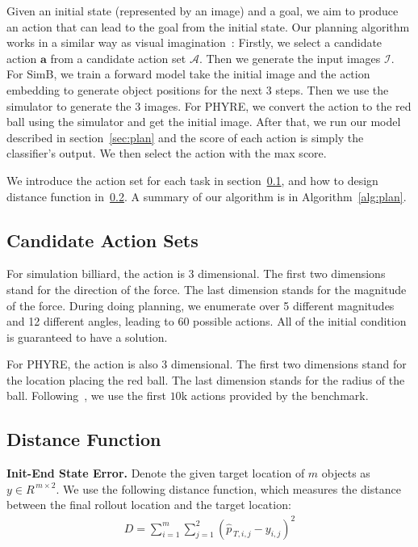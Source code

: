 \documentclass{article} \usepackage{iclr2021_conference,times}
\newcommand{\numoutput}{T}
\newcommand{\numobj}{m}
\begin{document}
Given an initial state (represented by an image) and a goal, we aim to produce an action that can lead to the goal from the initial state. Our planning algorithm works in a similar way as visual imagination~\cite{fragkiadaki2015learning}: Firstly, we select a candidate action $\mathbf{a}$ from a candidate action set $\mathcal{A}$. Then we generate the input images $\mathcal{I}$. For SimB, we train a forward model take the initial image and the action embedding to generate object positions for the next 3 steps. Then we use the simulator to generate the 3 images. For PHYRE, we convert the action to the red ball using the simulator and get the initial image. After that, we run our model described in section~\ref{sec:plan} and the score of each action is simply the classifier's output. We then select the action with the max score. 

We introduce the action set for each task in section~\ref{sec:actset}, and how to design distance function in~\ref{sec:dist}. A summary of our algorithm is in Algorithm~\ref{alg:plan}.

\subsection{Candidate Action Sets}
\label{sec:actset}

For simulation billiard, the action is 3 dimensional. The first two dimensions stand for the direction of the force. The last dimension stands for the magnitude of the force. During doing planning, we enumerate over 5 different magnitudes and 12 different angles, leading to 60 possible actions. All of the initial condition is guaranteed to have a solution.

For PHYRE, the action is also 3 dimensional. The first two dimensions stand for the location placing the red ball. The last dimension stands for the radius of the ball. Following~\citep{bakhtin2019phyre}, we use the first $10$k actions provided by the benchmark.

\subsection{Distance Function}
\label{sec:dist}

\textbf{Init-End State Error.} Denote the given target location of $\numobj$ objects as $y \in R^{\,\numobj \times 2}$. We use the following distance function, which measures the distance between the final rollout location and the target location:
\vspace{-0.8em}
\begin{align}
D = \sum_{i=1}^{\numobj}\sum_{j=1}^{2}(\hat{p}_{\, \numoutput, i, j} - y_{i,j})^2
\end{align}
\vspace{-0.8em}
\end{document}
